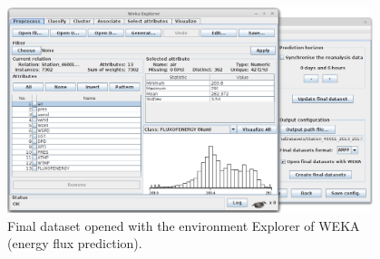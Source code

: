 \documentclass[energies,article,accept,moreauthors,pdftex]{Definitions/mdpi}
\begin{document}
\nointerlineskip
\begin{figure}[H]
				\widefigure
				\includegraphics[width=0.95\textwidth]{figures/FigureOpeningFinalDatasetWeka_EF.png}
				\caption{Final dataset opened with the environment Explorer of WEKA (energy flux prediction).}
				\label{fig:openigFinalDatasetWeka_EF}
			\end{figure}
\end{document}
